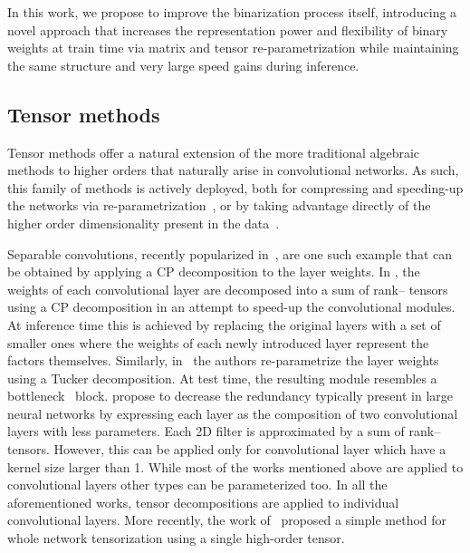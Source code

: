 \documentclass[10pt,twocolumn,letterpaper]{article}
\begin{document}
In this work, we propose to improve the binarization process itself, introducing a novel approach that increases the representation power and flexibility of binary weights at train time via matrix and tensor re-parametrization while maintaining the same structure and very large speed gains during inference.

\subsection{Tensor methods}\label{ssec:tensor-methods}
Tensor methods offer a natural extension of the more traditional algebraic methods to higher orders that naturally arise in convolutional networks. As such, this family of methods is actively deployed, both for compressing and speeding-up the networks via re-parametrization~\cite{lebedev2014speeding,yong2015compression,astrid2017cp,yong2015compression}, or by taking advantage directly of the higher order dimensionality present in the data~\cite{kossaifi_tcl,kossaifi2018tensor}.



Separable convolutions, recently popularized in~\cite{chollet2017xception}, are one such example that can be obtained by applying a CP decomposition to the layer weights. In \cite{lebedev2014speeding}, the weights of each convolutional layer are decomposed into a sum of rank-- tensors using a CP decomposition in an attempt to speed-up the convolutional modules. At inference time this is achieved by replacing the original layers with a set of smaller ones where the weights of each newly introduced layer represent the factors themselves.
Similarly, in~\cite{yong2015compression} the authors re-parametrize the layer weights using a Tucker decomposition. At test time, the resulting module resembles a bottleneck~\cite{he2016deep} block. \cite{tai2015convolutional} propose to decrease the redundancy typically present in large neural networks by  expressing each layer as the composition of two convolutional layers with less parameters. Each 2D filter is approximated by a sum of rank-- tensors. However, this can be applied only for convolutional layer which have a kernel size larger than 1. While most of the works mentioned above are applied to convolutional layers other types can be parameterized too. In all the aforementioned works, tensor decompositions are applied to individual convolutional layers. More recently, the work of~\cite{kossaifi2018parametrizing} proposed a simple method for whole network tensorization using a single high-order tensor. 
\end{document}
